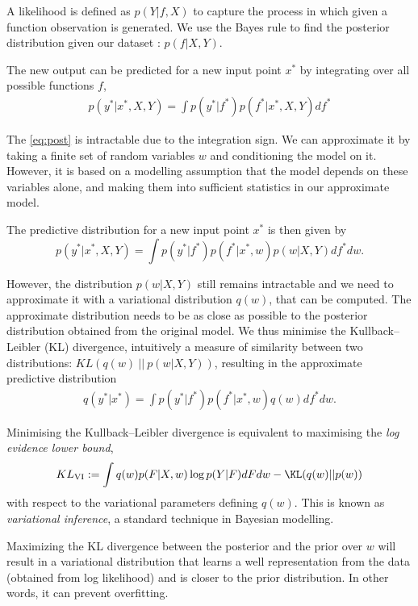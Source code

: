 A likelihood is defined as $p(Y | f, X)$ to capture the process in which given a function observation is generated. We use the Bayes rule to find the posterior distribution given our dataset : $p(f | X, Y)$.

The new output can be predicted for a new input point $x^*$ by integrating over all possible functions $f$,
\begin{align} \label{eq:post}
p(y^* | x^*, X, Y) = \int p(y^* | f^*) p(f^* | x^*, X, Y) df^*
\end{align}

The \eqref{eq:post} is intractable due to the integration sign. We can approximate it by taking a finite set of random variables $w$ and conditioning the model on it. However, it is based on a modelling assumption that the model depends on these variables alone, and making them into sufficient statistics in our approximate model.

The predictive distribution for a new input point $x^*$ is then given by 
$$
p(y^* | x^*, X, Y) = \int p(y^* | f^*) p(f^* | x^*, w) p(w | X, Y) df^* d w.
$$

However, the distribution $p(w | X, Y)$ still remains intractable and we need to approximate it with a variational distribution $q(w)$, that can be computed. The approximate distribution needs to be as close as possible to the posterior distribution obtained from the original model. We thus minimise the Kullback--Leibler (KL) divergence, intuitively a measure of similarity between two distributions: $KL(q(w) ~||~ p(w | X, Y))$,
resulting in the approximate predictive distribution 
\begin{align} \label{eq:predictive}
q(y^* | x^*) = \int p(y^* | f^*) p(f^* | x^*, w) q(w)  df^* dw.
\end{align}

Minimising the Kullback--Leibler divergence is equivalent to maximising the \textit{log evidence lower bound},
\begin{align}
KL_{\text{VI}} := \int q(w) p(F | X, w) \log p(Y | F) dF dw - \KL(q(w) || p(w)) \label{eq:L:VI}
\end{align}
with respect to the variational parameters defining $q(w)$. This is known as \textit{variational inference}, a standard technique in Bayesian modelling.

Maximizing the KL divergence between the posterior and the prior over $w$ will result in a variational distribution that learns a well representation from the data (obtained from log likelihood) and is closer to the prior distribution. In other words, it can prevent overfitting. 


